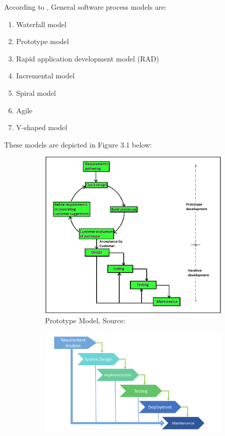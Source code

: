 According to \citet{Sharma:2015}, General software process models are:
\begin{enumerate}
	\item  Waterfall model
	\item  Prototype model
	\item  Rapid application development model (RAD)
	\item  Incremental model
	\item  Spiral model
	\item  Agile
	\item  V-shaped model
\end{enumerate}

These models are depicted in Figure 3.1 below:
\begin{figure}[htbp]
	\centering
	\begin{subfigure}[b]{0.45\textwidth}
		\centering
		\includegraphics[width=\linewidth]{./Prototyping-model}
		\caption{Prototype Model, Source: \citet{Kumar:2020}}
		\label{fig: 1}
	\end{subfigure}
	\hfill
	\begin{subfigure}[b]{0.45\textwidth}
		\centering
		\includegraphics[width=\linewidth]{./waterfall}

\end{subfigure}
\end{figure}
